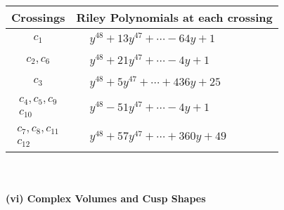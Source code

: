 \documentclass[1p]{elsarticle_modified}
\theoremstyle{definition}
\begin{document}
\begin{tabular}{m{50pt}|m{274pt}}
Crossings & \hspace{64pt}Riley Polynomials at each crossing \\
\hline $$\begin{aligned}c_{1}\end{aligned}$$&$\begin{aligned}
&y^{48}+13 y^{47}+\cdots-64 y+1
\end{aligned}$\\
\hline $$\begin{aligned}c_{2},c_{6}\end{aligned}$$&$\begin{aligned}
&y^{48}+21 y^{47}+\cdots-4 y+1
\end{aligned}$\\
\hline $$\begin{aligned}c_{3}\end{aligned}$$&$\begin{aligned}
&y^{48}+5 y^{47}+\cdots+436 y+25
\end{aligned}$\\
\hline $$\begin{aligned}c_{4},c_{5},c_{9}\\c_{10}\end{aligned}$$&$\begin{aligned}
&y^{48}-51 y^{47}+\cdots-4 y+1
\end{aligned}$\\
\hline $$\begin{aligned}c_{7},c_{8},c_{11}\\c_{12}\end{aligned}$$&$\begin{aligned}
&y^{48}+57 y^{47}+\cdots+360 y+49
\end{aligned}$\\
\hline
\end{tabular}\\~\\
\newpage\flushleft \textbf{(vi) Complex Volumes and Cusp Shapes}
\end{document}
